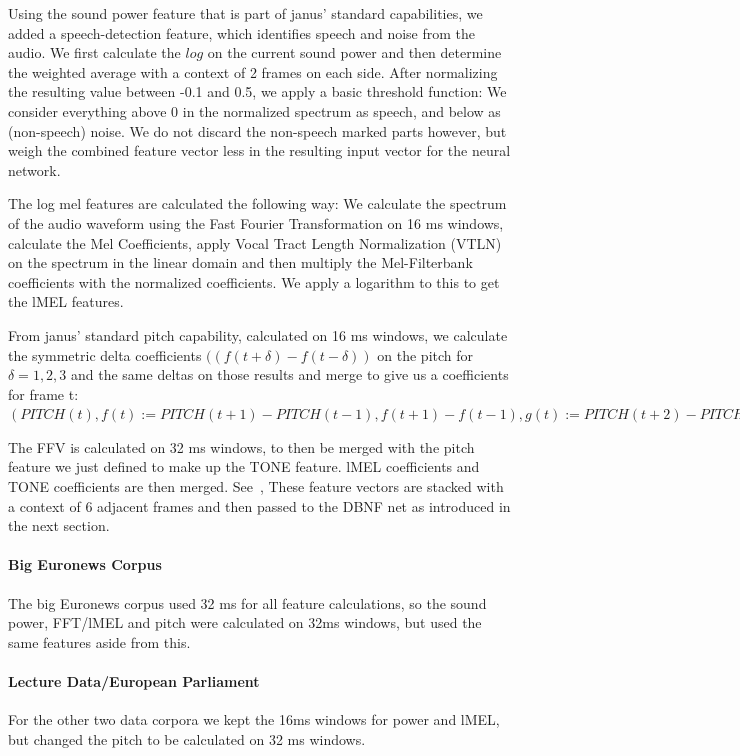 Using the sound power feature that is part of janus' standard capabilities, we added a speech-detection feature, which identifies speech and noise from the audio. We first calculate the \(log\) on the current sound power and then determine the weighted average with a context of 2 frames on each side. After normalizing the resulting value between -0.1 and 0.5, we apply a basic threshold function: We consider everything above 0 in the normalized spectrum as speech, and below as (non-speech) noise. We do not discard the non-speech marked parts however, but weigh the combined feature vector less in the resulting input vector for the neural network.

The log mel features are calculated the following way: We calculate the spectrum of the audio waveform using the Fast Fourier Transformation on 16 ms windows, calculate the Mel Coefficients, apply Vocal Tract Length Normalization (VTLN) on the spectrum in the linear domain and then multiply the Mel-Filterbank coefficients with the normalized coefficients. We apply a logarithm to this to get the lMEL features.

From janus' standard pitch capability, calculated on 16 ms windows, we calculate the symmetric delta coefficients \(((f(t+\delta) - f(t-\delta))\) on the pitch for \(\delta=1,2,3\) and the same deltas on those results and merge to give us a coefficients for frame t:
\((PITCH(t), f(t):=PITCH(t+1)-PITCH(t-1),f(t+1)-f(t-1),g(t):=PITCH(t+2)-PITCH(t-2),g(t+2)-g(t-2),h(t):=PITCH(t+3)-PITCH(t-3),h(t+3)-h(t-3))\)

The FFV is calculated on 32 ms windows, to then be merged  with the pitch feature we just defined to make up the TONE feature. lMEL coefficients and TONE coefficients are then merged. See~\cite{laskowski2009modeling},  \cite{laskowski2008fundamental}These feature vectors are stacked with a context of 6 adjacent frames and then passed to the DBNF net as introduced in the next section.
\paragraph{Big Euronews Corpus} The big Euronews corpus used 32 ms for all feature calculations, so the sound power, FFT/lMEL and pitch were calculated on 32ms windows, but used the same features aside from this.
\paragraph{Lecture Data/European Parliament} For the other two data corpora we kept the 16ms windows for power and lMEL, but changed the pitch to be calculated on 32 ms windows.

